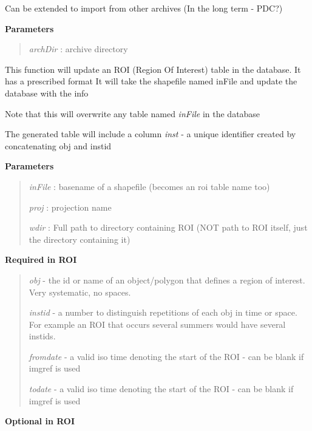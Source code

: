 \documentclass[letterpaper,10pt,openany,oneside]{sphinxmanual}
\begin{document}
\begin{fulllineitems}
\begin{fulllineitems}
Can be extended to import from other archives (In the long term - PDC?)

\textbf{Parameters}
\begin{quote}

\emph{archDir} : archive directory
\end{quote}

\end{fulllineitems}


\begin{fulllineitems}
\label{code:Database.Database.updateROI}
This function will update an ROI (Region Of Interest) table in the database. It has a prescribed format
It will take the shapefile named inFile and update the database with the info

Note that this will overwrite any table named \emph{inFile} in the database

The generated table will include a column \emph{inst} - a unique identifier created by 
concatenating obj and instid

\textbf{Parameters}
\begin{quote}

\emph{inFile}   : basename of a shapefile (becomes an roi table name too)

\emph{proj}     : projection name

\emph{wdir}     : Full path to directory containing ROI (NOT path to ROI itself, just the directory containing it)
\end{quote}

\textbf{Required in ROI}
\begin{quote}

\emph{obj}      - the id or name of an object/polygon that defines a region of interest. Very systematic, no spaces.

\emph{instid}   - a number to distinguish repetitions of each obj in time or space.  For example an ROI that occurs several summers would have several instids.

\emph{fromdate} - a valid iso time denoting the start of the ROI - can be blank if imgref is used

\emph{todate}   - a valid iso time denoting the start of the ROI - can be blank if imgref is used
\end{quote}

\textbf{Optional in ROI}
\begin{quote}


\end{quote}
\end{fulllineitems}
\end{fulllineitems}
\end{document}
